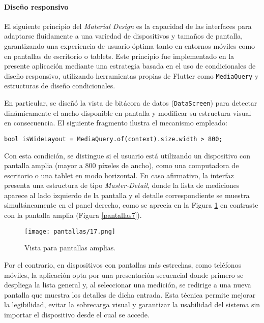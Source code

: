 \paragraph{Diseño responsivo}

El siguiente principio del \textit{Material Design} es la capacidad de las interfaces para adaptarse fluidamente a una variedad de dispositivos y tamaños de pantalla, garantizando una experiencia de usuario óptima tanto en entornos móviles como en pantallas de escritorio o tablets. Este principio fue implementado en la presente aplicación mediante una estrategia basada en el uso de condicionales de diseño responsivo, utilizando herramientas propias de Flutter como \texttt{MediaQuery} y estructuras de diseño condicionales.

En particular, se diseñó la vista de bitácora de datos (\texttt{DataScreen}) para detectar dinámicamente el ancho disponible en pantalla y modificar su estructura visual en consecuencia. El siguiente fragmento ilustra el mecanismo empleado:

\begin{verbatim}
bool isWideLayout = MediaQuery.of(context).size.width > 800;
\end{verbatim}

Con esta condición, se distingue si el usuario está utilizando un dispositivo con pantalla amplia (mayor a 800 píxeles de ancho), como una computadora de escritorio o una tablet en modo horizontal. En caso afirmativo, la interfaz presenta una estructura de tipo \textit{Master-Detail}, donde la lista de mediciones aparece al lado izquierdo de la pantalla y el detalle correspondiente se muestra simultáneamente en el panel derecho, como se aprecia en la Figura \ref{pantallas17} en contraste con la pantalla amplia (Figura \ref{pantallas7}).

\begin{figure}[h!]
    \centering
    \texttt{[image: pantallas/17.png]}
    \caption{Vista para pantallas amplias.}
    \label{pantallas17}
\end{figure}

Por el contrario, en dispositivos con pantallas más estrechas, como teléfonos móviles, la aplicación opta por una presentación secuencial donde primero se despliega la lista general y, al seleccionar una medición, se redirige a una nueva pantalla que muestra los detalles de dicha entrada. Esta técnica permite mejorar la legibilidad, evitar la sobrecarga visual y garantizar la usabilidad del sistema sin importar el dispositivo desde el cual se accede.

